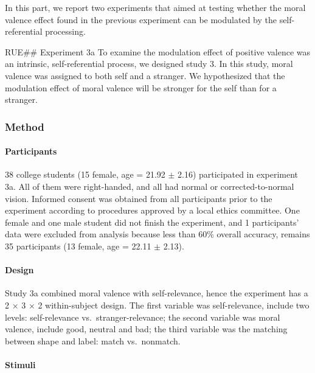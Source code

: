 \documentclass[
  english,
  man]{apa6}
\let\oldparagraph\paragraph
\renewcommand{\paragraph}[1]{\oldparagraph{#1}\mbox{}}
\begin{document}
In this part, we report two experiments that aimed at testing whether the moral valence effect found in the previous experiment can be modulated by the self-referential processing.

RUE\#\# Experiment 3a
To examine the modulation effect of positive valence was an intrinsic, self-referential process, we designed study 3. In this study, moral valence was assigned to both self and a stranger. We hypothesized that the modulation effect of moral valence will be stronger for the self than for a stranger.

\hypertarget{method-4}{%
\subsubsection{Method}\label{method-4}}

\hypertarget{participants-5}{%
\paragraph{Participants}\label{participants-5}}

38 college students (15 female, age = 21.92 \(\pm\) 2.16) participated in experiment 3a. All of them were right-handed, and all had normal or corrected-to-normal vision. Informed consent was obtained from all participants prior to the experiment according to procedures approved by a local ethics committee. One female and one male student did not finish the experiment, and 1 participants' data were excluded from analysis because less than 60\% overall accuracy, remains 35 participants (13 female, age = 22.11 \(\pm\) 2.13).

\hypertarget{design}{%
\paragraph{Design}\label{design}}

Study 3a combined moral valence with self-relevance, hence the experiment has a 2 × 3 × 2 within-subject design. The first variable was self-relevance, include two levels: self-relevance vs.~stranger-relevance; the second variable was moral valence, include good, neutral and bad; the third variable was the matching between shape and label: match vs.~nonmatch.

\hypertarget{stimuli-1}{%
\paragraph{Stimuli}\label{stimuli-1}}
\end{document}
